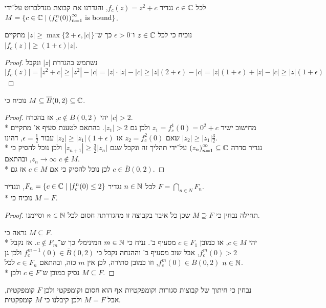 \Question{}
לכל $c \in \mathbb{C}$ נגדיר $f_c(z) = z^2 + c$, והגדרנו את קבוצת מנדלברוט על־ידי $M = \{ c \in \mathbb{C} \mid {(f_c^n(0))}_{n = 1}^\infty \text{ is bound}\}$.

\Subquestion{}
נוכיח כי לכל $z \in \mathbb{C}$ ו־$\epsilon > 0$ כך ש־$|z| \ge \max\{ 2 + \epsilon, |c|\}$ מתקיים $|f_c(z)| \ge (1 + \epsilon)|z|$.
\begin{proof}
	נשתמש בהגדרת $|z|$ ונקבל
	\[
		|f_c(z)| = |z^2 + c| \ge |z^2| - |c| = |z| \cdot |z| - |c| \ge |z| (2 + \epsilon) - |c|
		= |z| (1 + \epsilon) + |z| - |c| \ge |z| (1 + \epsilon)
	\]
\end{proof}

\Subquestion{}
נוכיח כי $M \subseteq \overline{B}(0, 2) \subseteq \mathbb{C}$.
\begin{proof}
	יהי $c \notin \overline{B}(0, 2)$, אז בהכרח $|c| > 2$. \\*
	מחישוב ישיר $z_1 = f_c^1(0) = 0^2 + c$ ולכן גם $|z_1| > 2$.
	בהתאם לטענת סעיף א' מתקיים שאם $z_2 = f_c^2(0)$ אז $|z_2| \ge |z_1|(1 + \epsilon)$ עבור $\epsilon = \frac{1}{2}$, דהינו $|z_2| \ge |z_1| \frac{3}{2}$. \\*
	נגדיר סדרה ${(z_n)}_{n = 1}^\infty \subseteq \mathbb{C}$ על־ידי תהליך זה ונקבל שגם $|z_{n + 1}| \ge \frac{3}{2} |z_n|$ ולכן נוכל להסיק כי $z_n \to \infty$, ובהתאם $c \notin M$. \\*
	לכן נוכל להסיק כי אם $c \in M$ אז גם $c \in \overline{B}(0, 2)$.
\end{proof}

\Subquestion{}
לכל $n \in \mathbb{N}$ נגדיר $F_n = \{ c \in \mathbb{C} \mid |f_c^n(0) \le 2 \}$, ונגדיר $F = \bigcap_{n \in N} F_n$. \\*
נוכיח כי $M = F$.
\begin{proof}
	תחילה נבחין כי $M \supseteq F$ שכן כל איבר בקבוצה זו מהגדרתה חסום לכל $n \in \mathbb{N}$ וסיימנו.

	נראה כי $M \subseteq F$. \\*
	יהי $c \in M$, אז כמובן $c \in F_1$ מסעיף ב'.
	נניח כי $m \in \mathbb{N}$ המינימלי כך ש־$c \notin F_m$.
	אז נקבל $f_c^m(0) > 2$, אבל שוב מסעיף ב' וההנחה נקבל כי $f_c^{m - 1}(0) \in \overline{B}(0, 2)$ ולכן גן $f_c^m(0) \in \overline{B}(0, 2)$, וזו כמובן סתירה, לכן אין $m$ כזה, ובהתאם $c \in F_n$ לכל $n \in \mathbb{N}$. \\*
	נסיק כמובן ש־$c \in F$ ולכן $M \subseteq F$.
\end{proof}
נבחין כי חיתוך של קבוצות סגורות וקומפקטיות אף הוא חסום וקומפקטי ולכן $F$ קומפקטית, אבל $M = F$ ולכן קיבלנו כי $M$ קומפקטית.

